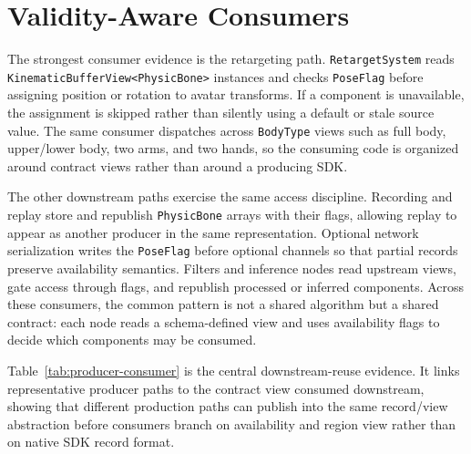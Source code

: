 \documentclass[runningheads]{llncs}
\begin{document}
\section{Validity-Aware Consumers}\label{sec:consumers}
The strongest consumer evidence is the retargeting path. \texttt{RetargetSystem} reads \texttt{KinematicBufferView<PhysicBone>} instances and checks \texttt{PoseFlag} before assigning position or rotation to avatar transforms. If a component is unavailable, the assignment is skipped rather than silently using a default or stale source value. The same consumer dispatches across \texttt{BodyType} views such as full body, upper/lower body, two arms, and two hands, so the consuming code is organized around contract views rather than around a producing SDK.

The other downstream paths exercise the same access discipline. Recording and replay store and republish \texttt{PhysicBone} arrays with their flags, allowing replay to appear as another producer in the same representation. Optional network serialization writes the \texttt{PoseFlag} before optional channels so that partial records preserve availability semantics. Filters and inference nodes read upstream views, gate access through flags, and republish processed or inferred components. Across these consumers, the common pattern is not a shared algorithm but a shared contract: each node reads a schema-defined view and uses availability flags to decide which components may be consumed.

Table~\ref{tab:producer-consumer} is the central downstream-reuse evidence. It links representative producer paths to the contract view consumed downstream, showing that different production paths can publish into the same record/view abstraction before consumers branch on availability and region view rather than on native SDK record format.
\end{document}
